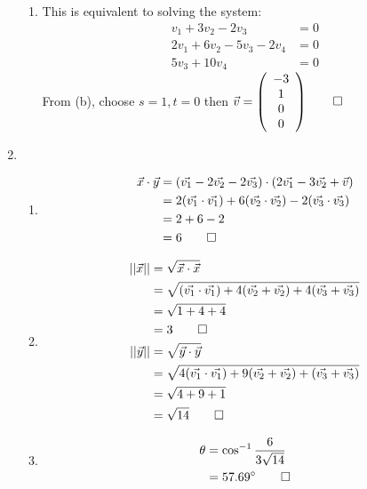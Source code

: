\documentclass[12pt, a4paper]{article}
\begin{document}
\begin{enumerate}[Q\arabic*.]
\begin{enumerate}[(\alph*)]
      \item This is equivalent to solving the system:
        \begin{align*}
          v_1 + 3v_2 -2v_3 &=0\\
          2v_1 + 6v_2 -5v_3 - 2v_4 & = 0\\
          5v_3 + 10v_4 &=0
        \end{align*}
        From (b), choose $s=1, t=0$ then $\vec{v} = \left(\begin{array}{c} -3\\ 1\\0\\ 0 \end{array}\right) \qed$
    \end{enumerate}

  \item 
    \begin{enumerate}[(\alph*)]
      \item
        \begin{align*}
          \vec{x} \cdot \vec{y} &= (\vec{v_1} -2\vec{v_2}-2 \vec{v_3}) \cdot (2 \vec{v_1} -3 \vec{v_2} + \vec{v})\\
                                &= 2(\vec{v_1} \cdot \vec{v_1}) + 6(\vec{v_2} \cdot \vec{v_2})-2(\vec{v_3}\cdot \vec{v_3})\\
                                &= 2+6-2\\
                                &= 6\qed
        \end{align*}

      \item 
        \begin{align*}
          ||\vec{x}|| &= \sqrt{\vec{x} \cdot \vec{x}}\\
                      &= \sqrt{(\vec{v_1} \cdot \vec{v_1}) + 4(\vec{v_2} + \vec{v_2}) + 4(\vec{v_3} + \vec{v_3})}\\
                      &= \sqrt{1+4+4}\\
                      &= 3 \qed\\
          ||\vec{y}|| &= \sqrt{\vec{y} \cdot \vec{y}}\\
                      &= \sqrt{4(\vec{v_1} \cdot \vec{v_1}) + 9(\vec{v_2} + \vec{v_2}) + (\vec{v_3} + \vec{v_3})}\\
                      &= \sqrt{4+9+1}\\
                      &= \sqrt{14} \qed
        \end{align*}

      \item 
        \begin{align*}
          \theta &= \cos^{-1} \frac{6}{3\sqrt{14}}\\
                 &= 57.69^{\circ}\qed
        \end{align*}
    \end{enumerate}


\end{enumerate}
\end{document}
